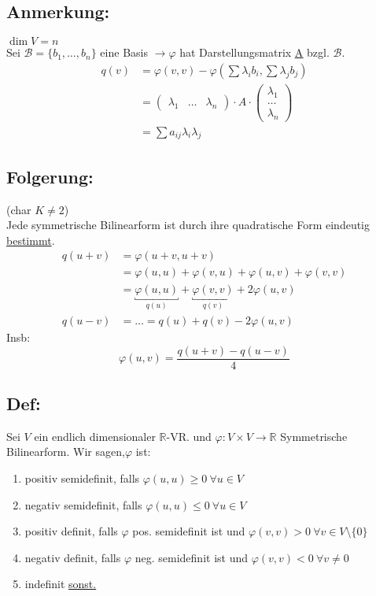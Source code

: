 \documentclass[titlepage,12pt,a4paper,ngerman]{report}
\begin{document}
\subsection*{Anmerkung:}
$ \dim V = n $\\
Sei $ \mathcal{B} = \{b_1,\dots,b_n\} $ eine Basis $ \rightarrow \varphi $ hat Darstellungsmatrix \underline{\underline{A}} bzgl. $ \mathcal{B} $.
\begin{align*}
q(v) & = \varphi(v,v) - \varphi(\sum\lambda_i b_i , \sum \lambda_j b_j)\\
& = \begin{pmatrix}
\lambda_1 & \dots & \lambda_n
\end{pmatrix} \cdot A \cdot \begin{pmatrix}
\lambda_1\\
\dots\\
\lambda_n
\end{pmatrix}\\
& = \sum a_{ij} \lambda_i \lambda_j
\end{align*}
\subsection*{Folgerung:}
(char $ K \neq 2 $)\\
Jede symmetrische Bilinearform ist durch ihre quadratische Form eindeutig \underline{bestimmt}.
\begin{align*}
q(u+v) & = \varphi(u+v,u+v)\\
& = \varphi(u,u) + \varphi(v,u) + \varphi(u,v) + \varphi(v,v)\\
& = \underbracket{\varphi(u,u)}_{q(u)} + \underbracket{\varphi(v,v)}_{q(v)} + 2 \varphi(u,v)\\
q(u-v) & = \dots = q(u) + q(v) - 2 \varphi(u,v)
\end{align*}
Insb:
$$ \varphi(u,v) = \frac{q(u+v) - q(u-v)}{4} $$


\subsection{Def:}
Sei $V$ ein endlich dimensionaler $\mathbb R$-VR. und $ \varphi:V\times V \to \mathbb R$ Symmetrische Bilinearform. Wir sagen,$\varphi$ ist:
\begin{enumerate}
	\item positiv semidefinit, falls $\varphi(u, u) \geq 0\ \forall u \in V$
	\item negativ semidefinit, falls $\varphi(u,u) \leq 0\ \forall u \in V$
	\item positiv definit, falls $\varphi$ pos. semidefinit ist und $\varphi(v,v) > 0\ \forall v \in V \setminus \{0\}$
	\item negativ definit, falls $\varphi$ neg. semidefinit ist und $\varphi(v,v) < 0\ \forall v \neq 0$
	\item indefinit \underline{sonst.}
\end{enumerate}
\end{document}

